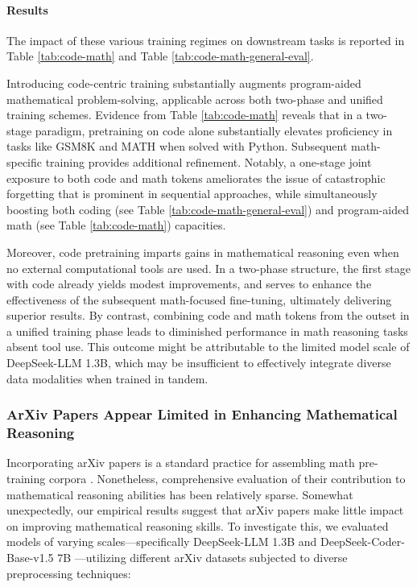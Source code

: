 \paragraph{Results}
The impact of these various training regimes on downstream tasks is reported in Table \ref{tab:code-math} and Table \ref{tab:code-math-general-eval}.

Introducing code-centric training substantially augments program-aided mathematical problem-solving, applicable across both two-phase and unified training schemes. Evidence from Table \ref{tab:code-math} reveals that in a two-stage paradigm, pretraining on code alone substantially elevates proficiency in tasks like GSM8K and MATH when solved with Python. Subsequent math-specific training provides additional refinement. Notably, a one-stage joint exposure to both code and math tokens ameliorates the issue of catastrophic forgetting that is prominent in sequential approaches, while simultaneously boosting both coding (see Table \ref{tab:code-math-general-eval}) and program-aided math (see Table \ref{tab:code-math}) capacities.

Moreover, code pretraining imparts gains in mathematical reasoning even when no external computational tools are used. In a two-phase structure, the first stage with code already yields modest improvements, and serves to enhance the effectiveness of the subsequent math-focused fine-tuning, ultimately delivering superior results. By contrast, combining code and math tokens from the outset in a unified training phase leads to diminished performance in math reasoning tasks absent tool use. This outcome might be attributable to the limited model scale of DeepSeek-LLM 1.3B, which may be insufficient to effectively integrate diverse data modalities when trained in tandem.

\subsubsection{ArXiv Papers Appear Limited in Enhancing Mathematical Reasoning}

Incorporating arXiv papers is a standard practice for assembling math pre-training corpora \citep{minerva,gpt-f,llemma,mathpile}. Nonetheless, comprehensive evaluation of their contribution to mathematical reasoning abilities has been relatively sparse. Somewhat unexpectedly, our empirical results suggest that arXiv papers make little impact on improving mathematical reasoning skills. To investigate this, we evaluated models of varying scales—specifically DeepSeek-LLM 1.3B and DeepSeek-Coder-Base-v1.5 7B \citep{deepseek-coder}—utilizing different arXiv datasets subjected to diverse preprocessing techniques:


